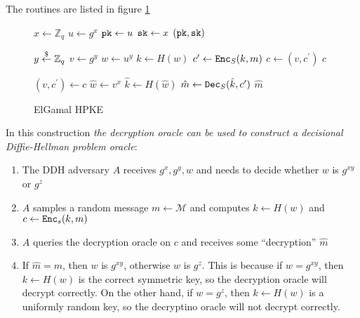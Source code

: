 \documentclass{article}
\begin{document}
The routines are listed in figure \ref{fig:cca-elgamal-routines}

\begin{figure}[H]
    \begin{algorithm}[H]
        \caption{$\keygen$}
        \begin{algorithmic}[1]
            \State $x \leftarrow \mathbb{Z}_q$
            \State $u \leftarrow g^x$
            \State $\texttt{pk} \leftarrow u$
            \State $\texttt{sk} \leftarrow x$
            \State \Return $(\texttt{pk}, \texttt{sk})$
        \end{algorithmic}
    \end{algorithm}
    \begin{algorithm}[H]
        \caption{$\encrypt(\pk = u, m \in \mathcal{M})$}
        \begin{algorithmic}[1]
            \State $y \stackrel{\$}{\leftarrow} \mathbb{Z}_q$
            \State $v \leftarrow g^y$
            \State $w \leftarrow u^y$
            \State $k \leftarrow H(w)$
            \State $c^\prime \leftarrow \texttt{Enc}_S(k, m)$
            \State $c \leftarrow (v, c^\prime)$
            \State \Return $c$
        \end{algorithmic}
    \end{algorithm}
    \begin{algorithm}[H]
        \caption{$\decrypt(\sk = x, c)$}
        \begin{algorithmic}[1]
            \State $(v, c^\prime) \leftarrow c$
            \State $\hat{w} \leftarrow v^x$
            \State $\hat{k} \leftarrow H(\hat{w})$
            \State $\hat{m} \leftarrow \texttt{Dec}_S(\hat{k}, c^\prime)$
            \State \Return $\hat{m}$
        \end{algorithmic}
    \end{algorithm}
    \caption{ElGamal HPKE}\label{fig:cca-elgamal-routines}
\end{figure}

In this construction \emph{the decryption oracle can be used to construct a decisional Diffie-Hellman problem oracle}: \begin{enumerate}
    \item The DDH adversary $A$ receives $g^x, g^y, w$ and needs to decide whether $w$ is $g^{xy}$ or $g^z$
    \item $A$ samples a random message $m \leftarrow \mathcal{M}$ and computes $k \leftarrow H(w)$ and $c \leftarrow \texttt{Enc}_s(k, m)$
    \item $A$ queries the decryption oracle on $c$ and receives some ``decryption'' $\hat{m}$
    \item If $\hat{m} = m$, then $w$ is $g^{xy}$, otherwise $w$ is $g^z$. This is because if $w = g^{xy}$, then $k \leftarrow H(w)$ is the correct symmetric key, so the decryption oracle will decrypt correctly. On the other hand, if $w = g^z$, then $k \leftarrow H(w)$ is a uniformly random key, so the decryptino oracle will not decrypt correctly.
\end{enumerate}
\end{document}
